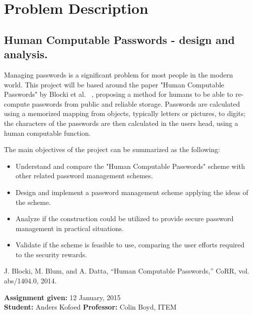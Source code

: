 \chapter*{Problem Description}
\section*{Human Computable Passwords - design and analysis.}
Managing passwords is a significant problem for most people in the modern world. This project will be based around the paper "Human Computable Passwords" by Blocki et al. ~\cite{hcp-blocki}, proposing a method for humans to be able to re-compute passwords from public and reliable storage. Passwords are calculated using a memorized mapping from objects, typically letters or pictures, to digits; the characters of the passwords are then calculated in the users head, using a human computable function.
\par The main objectives of the project can be summarized as the following:

\begin{itemize}
    \item Understand and compare the "Human Computable Passwords" scheme with other related password management schemes.
    \item Design and implement a password management scheme applying the ideas of the scheme.
    \item Analyze if the construction could be utilized to provide secure password management in practical situations.
    \item Validate if the scheme is feasible to use, comparing the user efforts required to the security rewards.

\end{itemize}

\noindent
[1] J. Blocki, M. Blum, and A. Datta, “Human Computable Passwords,” CoRR, vol. abs/1404.0, 2014.

\noindent
\textbf{Assignment given: }12 January, 2015 \\
\textbf{Student: }Anders Kofoed \hfill \textbf{Professor: }Colin Boyd, ITEM \\

